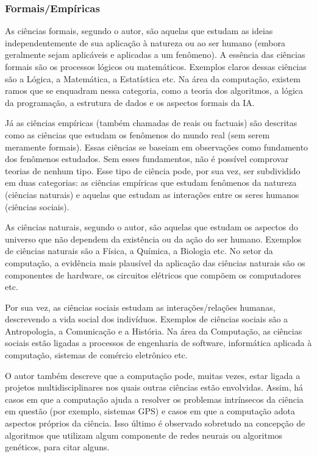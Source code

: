 \documentclass[12pt,a4paper]{article}
\begin{document}
\subsubsection{Formais/Empíricas}

As ciências formais, segundo o autor, são aquelas que estudam as ideias independentemente de sua aplicação à natureza ou ao ser humano 
(embora geralmente sejam aplicáveis e aplicadas a um fenômeno). A essência das ciências formais são os processos lógicos ou matemáticos. Exemplos 
claros dessas ciências são a Lógica, a Matemática, a Estatística etc. Na área da computação, existem ramos que se enquadram nessa categoria, como a teoria dos algoritmos, a lógica da programação, a estrutura de dados e os aspectos formais da IA.

Já as ciências empíricas (também chamadas de reais ou factuais) são descritas como as ciências que estudam os fenômenos do mundo real (sem serem meramente formais). Essas ciências se baseiam em observações como fundamento dos fenômenos estudados. Sem esses fundamentos, não é possível comprovar teorias de nenhum tipo. Esse tipo de ciência pode, por sua vez, ser subdividido em duas categorias: as ciências empíricas que estudam fenômenos da natureza (ciências naturais) e aquelas que estudam as interações entre os seres humanos (ciências sociais).

As ciências naturais, segundo o autor, são aquelas que estudam os aspectos do universo que não dependem da existência ou da ação do ser humano. Exemplos de ciências naturais são a Física, a Química, a Biologia etc. No setor da computação, a evidência mais plausível da aplicação das ciências naturais são os componentes de hardware, os circuitos elétricos que compõem os computadores etc.

Por sua vez, as ciências sociais estudam as interações/relações humanas, descrevendo a vida social dos indivíduos. Exemplos de ciências sociais são a Antropologia, a Comunicação e a História. Na área da Computação, as ciências sociais estão ligadas a processos de engenharia de software, informática aplicada à computação, sistemas de comércio eletrônico etc.

O autor também descreve que a computação pode, muitas vezes, estar ligada a projetos multidisciplinares nos quais outras ciências estão envolvidas. Assim, há casos em que a computação ajuda a resolver os problemas intrínsecos da ciência em questão (por exemplo, sistemas GPS) e casos em que a computação adota aspectos próprios da ciência. Isso último é observado sobretudo na concepção de algoritmos que utilizam algum componente de redes neurais ou algoritmos genéticos, para citar alguns.
\end{document}
